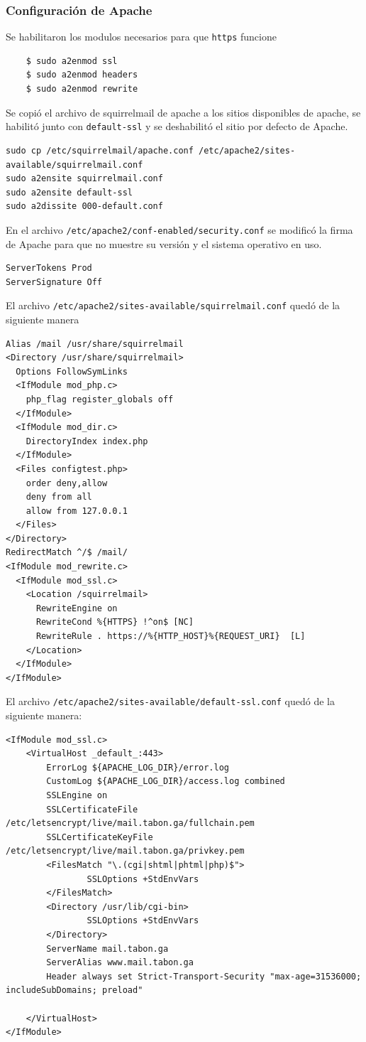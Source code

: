 \documentclass[9pt]{article}
\begin{document}

\subsubsection*{Configuración de Apache}

Se habilitaron los modulos necesarios para que \texttt{https} funcione \\
\begin{verbatim}
    $ sudo a2enmod ssl
    $ sudo a2enmod headers
    $ sudo a2enmod rewrite
\end{verbatim}

Se copió el archivo de squirrelmail de apache a los sitios disponibles de apache, se habilitó junto con \texttt{default-ssl} y se deshabilitó el sitio por defecto de Apache. \\
\begin{verbatim}
sudo cp /etc/squirrelmail/apache.conf /etc/apache2/sites-available/squirrelmail.conf
sudo a2ensite squirrelmail.conf
sudo a2ensite default-ssl
sudo a2dissite 000-default.conf
\end{verbatim}

En el archivo \texttt{/etc/apache2/conf-enabled/security.conf} se modificó la firma de Apache para que no muestre su versión y el sistema operativo en uso. \\
\begin{verbatim}
ServerTokens Prod
ServerSignature Off
\end{verbatim}

El archivo \texttt{/etc/apache2/sites-available/squirrelmail.conf} quedó de la siguiente manera
\begin{verbatim}
Alias /mail /usr/share/squirrelmail
<Directory /usr/share/squirrelmail>
  Options FollowSymLinks
  <IfModule mod_php.c>
    php_flag register_globals off
  </IfModule>
  <IfModule mod_dir.c>
    DirectoryIndex index.php
  </IfModule>
  <Files configtest.php>
    order deny,allow
    deny from all
    allow from 127.0.0.1
  </Files>
</Directory>
RedirectMatch ^/$ /mail/
<IfModule mod_rewrite.c>
  <IfModule mod_ssl.c>
    <Location /squirrelmail>
      RewriteEngine on
      RewriteCond %{HTTPS} !^on$ [NC]
      RewriteRule . https://%{HTTP_HOST}%{REQUEST_URI}  [L]
    </Location>
  </IfModule>
</IfModule>
\end{verbatim}

El archivo \texttt{/etc/apache2/sites-available/default-ssl.conf} quedó de la siguiente manera:
\begin{verbatim}
<IfModule mod_ssl.c>
	<VirtualHost _default_:443>
		ErrorLog ${APACHE_LOG_DIR}/error.log
		CustomLog ${APACHE_LOG_DIR}/access.log combined
		SSLEngine on
		SSLCertificateFile	/etc/letsencrypt/live/mail.tabon.ga/fullchain.pem
		SSLCertificateKeyFile /etc/letsencrypt/live/mail.tabon.ga/privkey.pem
		<FilesMatch "\.(cgi|shtml|phtml|php)$">
				SSLOptions +StdEnvVars
		</FilesMatch>
		<Directory /usr/lib/cgi-bin>
				SSLOptions +StdEnvVars
		</Directory>
		ServerName mail.tabon.ga
		ServerAlias www.mail.tabon.ga
		Header always set Strict-Transport-Security "max-age=31536000; includeSubDomains; preload"
 
	</VirtualHost>
</IfModule>
\end{verbatim}
\end{document}
